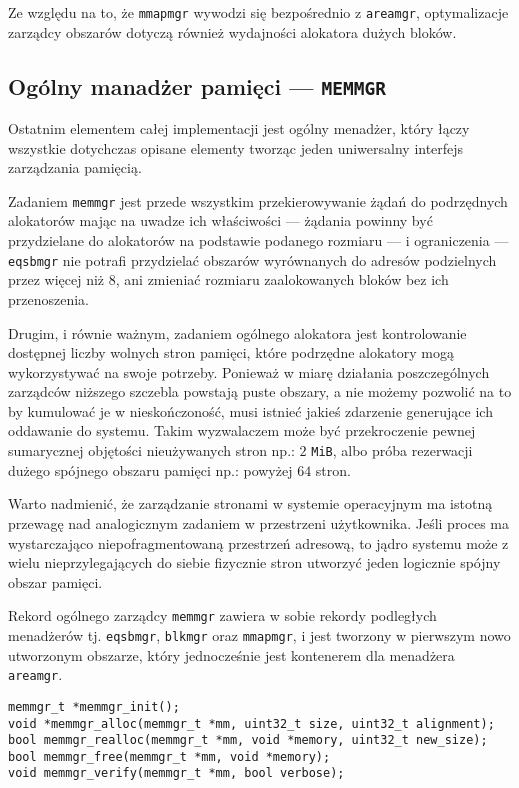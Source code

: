 \documentclass[12pt,a4paper,titlepage,twoside]{mwart}
\begin{document}
Ze względu na to, że \verb+mmapmgr+ wywodzi się bezpośrednio z \verb+areamgr+,
optymalizacje zarządcy obszarów dotyczą również wydajności alokatora dużych
bloków.

\newpage

\subsection{Ogólny manadżer pamięci --- \texttt{MEMMGR}}

Ostatnim elementem całej implementacji jest ogólny menadżer, który łączy
wszystkie dotychczas opisane elementy tworząc jeden uniwersalny interfejs
zarządzania pamięcią.

Zadaniem \verb+memmgr+ jest przede wszystkim przekierowywanie żądań do
podrzędnych alokatorów mając na uwadze ich właściwości --- żądania powinny być
przydzielane do alokatorów na podstawie podanego rozmiaru --- i ograniczenia
--- \verb+eqsbmgr+ nie potrafi przydzielać obszarów wyrównanych do adresów
podzielnych przez więcej niż $8$, ani zmieniać rozmiaru zaalokowanych bloków
bez ich przenoszenia.

Drugim, i równie ważnym, zadaniem ogólnego alokatora jest kontrolowanie
dostępnej liczby wolnych stron pamięci, które podrzędne alokatory mogą
wykorzystywać na swoje potrzeby. Ponieważ w miarę działania poszczególnych
zarządców niższego szczebla powstają puste obszary, a nie możemy pozwolić na to
by kumulować je w nieskończoność, musi istnieć jakieś zdarzenie generujące ich
oddawanie do systemu. Takim wyzwalaczem może być przekroczenie pewnej
sumarycznej objętości nieużywanych stron np.: $2$ \verb+MiB+, albo próba
rezerwacji dużego spójnego obszaru pamięci np.: powyżej $64$ stron. 

Warto nadmienić, że zarządzanie stronami w systemie operacyjnym ma istotną
przewagę nad analogicznym zadaniem w przestrzeni użytkownika. Jeśli proces ma
wystarczająco niepofragmentowaną przestrzeń adresową, to jądro systemu może z
wielu nieprzylegających do siebie fizycznie stron utworzyć jeden logicznie
spójny obszar pamięci.

Rekord ogólnego zarządcy \verb+memmgr+ zawiera w sobie rekordy podległych
menadżerów tj. \verb+eqsbmgr+, \verb+blkmgr+ oraz \verb+mmapmgr+, i jest
tworzony w pierwszym nowo utworzonym obszarze, który jednocześnie jest
kontenerem dla menadżera \verb+areamgr+. 

\vspace{2ex}
\begin{lstlisting}[caption={Prototypy funkcji menedżera pamięci \texttt{memmgr}.},xleftmargin=1cm,xrightmargin=1cm]
memmgr_t *memmgr_init();
void *memmgr_alloc(memmgr_t *mm, uint32_t size, uint32_t alignment);
bool memmgr_realloc(memmgr_t *mm, void *memory, uint32_t new_size);
bool memmgr_free(memmgr_t *mm, void *memory);
void memmgr_verify(memmgr_t *mm, bool verbose);
\end{lstlisting}
\end{document}
